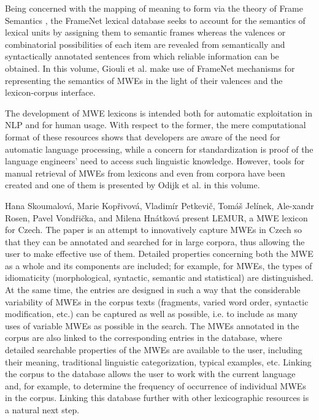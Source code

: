 \begin{refsection}
Being concerned with the mapping of meaning to form via the theory of Frame Semantics \citep{fillmore_1976, fillmore_1977, fillmore_1982}, the FrameNet lexical database \citep{baker_etal_1998} seeks to account for the semantics of lexical units by assigning them to semantic frames whereas the valences or combinatorial possibilities of each item are revealed from semantically and syntactically annotated sentences from which reliable information can be obtained. In this volume, Giouli et al. make use of FrameNet mechanisms for representing the semantics of MWEs in the light of their valences and the lexicon-corpus interface.

The development of MWE lexicons is intended both for automatic exploitation in NLP and for human usage. With respect to the former, the mere computational format of these resources shows that developers are aware of the need for automatic language processing, while a concern for standardization is proof of the language engineers' need to access such linguistic knowledge. However, tools for manual retrieval of MWEs from lexicons and even from corpora have been created and one of them is presented by Odijk et al. in this volume. 

Hana   Skoumalová,   Marie  Kopřivová,  Vladimír   Petkevič,    Tomáš   Jelínek, 
Ale-xandr Rosen, Pavel Vondřička, and Milena Hnátková 
present LEMUR, a MWE lexicon for Czech. The paper is an attempt to innovatively capture MWEs in Czech so that they can be annotated and searched for in large corpora, thus allowing the user to make effective use of them. Detailed properties concerning both the MWE as a whole and its components are included; for example, for MWEs, the types of idiomaticity (morphological, syntactic, semantic and statistical) are distinguished. At the same time, the entries are designed in such a way that the considerable variability of MWEs in the corpus texts (fragments, varied word order, syntactic modification, etc.) can be captured as well as possible, i.e. to include as many uses of variable MWEs as possible in the search. The MWEs annotated in the corpus are also linked to the corresponding entries in the database, where detailed searchable properties of the MWEs are available to the user, including their meaning, traditional linguistic categorization, typical examples, etc. Linking the corpus to the database allows the user to work with the current language and, for example, to determine the frequency of occurrence of individual MWEs in the corpus. Linking this database further with other lexicographic resources is a natural next step.


\end{refsection}
